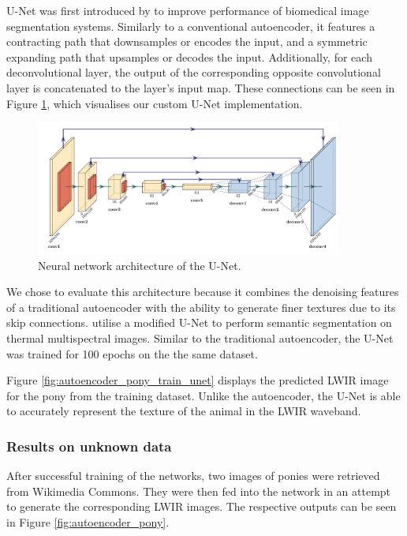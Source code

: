\documentclass{l4proj}
\begin{document}
U-Net was first introduced by \citet{ronneberger_u-net_2015} to improve performance of biomedical image segmentation systems. Similarly to a conventional autoencoder, it features a contracting path that downsamples or encodes the input, and a symmetric expanding path that upsamples or decodes the input. Additionally, for each deconvolutional layer, the output of the corresponding opposite convolutional layer is concatenated to the layer's input map. These connections can be seen in Figure \ref{fig:unet_architecture}, which visualises our custom U-Net implementation. 

\begin{figure}[ht]
  \centering
  \includegraphics[width=0.9\textwidth]{images/models/unet}
  \caption{Neural network architecture of the U-Net.}
  \label{fig:unet_architecture}
\end{figure}

We chose to evaluate this architecture because it combines the denoising features of a traditional autoencoder with the ability to generate finer textures due to its skip connections. \citet{osin_fast_2018} utilise a modified U-Net to perform semantic segmentation on thermal multispectral images. Similar to the traditional autoencoder, the U-Net was trained for 100 epochs on the the same dataset. 

Figure \ref{fig:autoencoder_pony_train_unet} displays the predicted LWIR image for the pony from the training dataset. Unlike the autoencoder, the U-Net is able to accurately represent the texture of the animal in the LWIR waveband.

\subsubsection{Results on unknown data}

After successful training of the networks, two images of ponies were retrieved from Wikimedia Commons. They were then fed into the network in an attempt to generate the corresponding LWIR images. The respective outputs can be seen in Figure \ref{fig:autoencoder_pony}.
\end{document}
